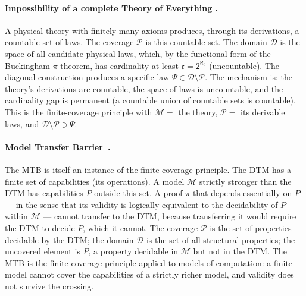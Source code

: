 \documentclass[11pt]{article}
\begin{document}
\paragraph{Impossibility of a complete Theory of Everything \cite{buono2026syntaxseedynamicsyntactic}.}
A physical theory with finitely many axioms produces, through its
derivations, a countable set of laws. The coverage $\mathcal{P}$ is this
countable set. The domain $\mathcal{D}$ is the space of all candidate
physical laws, which, by the functional form of the Buckingham $\pi$
theorem, has cardinality at least $\mathfrak{c} = 2^{\aleph_0}$
(uncountable). The diagonal construction produces a specific law
$\Psi \in \mathcal{D} \setminus \mathcal{P}$. The mechanism is: the
theory's derivations are countable, the space of laws is uncountable,
and the cardinality gap is permanent (a countable union of countable sets
is countable). This is the finite-coverage principle with
$\mathcal{M} = $ the theory, $\mathcal{P} = $ its derivable laws, and
$\mathcal{D} \setminus \mathcal{P} \ni \Psi$.

\paragraph{Model Transfer Barrier~\cite{buono2026limitsuniformcertificationstandard}.}
The MTB is itself an instance of the finite-coverage principle. 
The DTM has a finite set of capabilities (its operations). 
A model $\mathcal{M}$ strictly stronger than the DTM has capabilities $P$ 
outside this set. A proof $\pi$ that depends essentially on $P$ --- in 
the sense that its validity is logically equivalent to the decidability of $P$ within
$\mathcal{M}$ --- cannot transfer to the DTM, because transferring it
would require the DTM to decide $P$, which it cannot. The coverage
$\mathcal{P}$ is the set of properties decidable by the DTM; the domain
$\mathcal{D}$ is the set of all structural properties; the uncovered
element is $P$, a property decidable in $\mathcal{M}$ but not in the
DTM. The MTB is the finite-coverage principle applied to models of
computation: a finite model cannot cover the capabilities of a strictly
richer model, and validity does not survive the crossing.

\newpage
\end{document}
